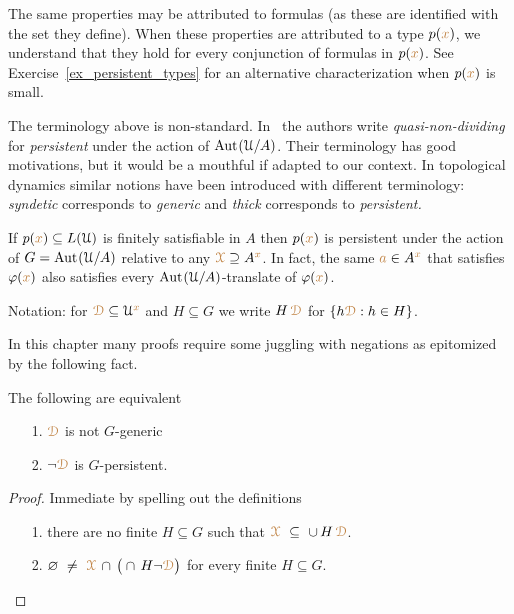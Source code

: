 The same properties may be attributed to formulas (as these are identified with the set they define).
When these properties are attributed to a type $p({\color{brown} x})$, we understand that they hold for every conjunction of formulas in $p({\color{brown} x})$.
See Exercise~\ref{ex_persistent_types} for an alternative characterization when $p({\color{brown} x})$ is small.

\noindent\llap{\textcolor{red}{\Large\warning}\kern1.5ex}\ignorespaces
The terminology above is non-standard.
In~\cite{CK} the authors write \textit{quasi-non-dividing\/} for \textit{persistent\/} under the action of ${\rm Aut\kern.15ex}(\EuScript U/A)$.
Their terminology has good motivations, but it would be a mouthful if adapted to our context.
In topological dynamics similar notions have been introduced with different terminology: \textit{syndetic\/} corresponds to \textit{generic\/} and \textit{thick\/} corresponds to \textit{persistent.}

\begin{example}
  If $p({\color{brown} x})\subseteq L(\EuScript U)$ is finitely satisfiable in $A$ then $p({\color{brown} x})$ is persistent under the action of $G={\rm Aut\kern.15ex}(\EuScript U/A)$ relative to any ${\color{brown}\EuScript X}\supseteq A^{\color{brown} x}$.
  In fact, the same ${\color{brown} a}\in A^{\color{brown} x}$ that satisfies $\varphi({\color{brown} x})$ also satisfies every ${\rm Aut\kern.15ex}(\EuScript U/A)$-translate of $\varphi({\color{brown} x})$.
\end{example}

Notation: for ${\color{brown}\EuScript D}\subseteq\EuScript U^{\color{brown} x}$ and $H\subseteq G$ we write \emph{$H\,{\color{brown}\EuScript D}$\/} for $\{h{\color{brown}\EuScript D}: h\in H\}$.

In this chapter many proofs require some juggling with negations as epitomized by the following fact.

\begin{fact}\label{fact_fip}
  The following are equivalent
  \begin{itemize}
    \item[1.] ${\color{brown}\EuScript D}$ is not $G$-generic
    \item[2.] $\neg{\color{brown}\EuScript D}$ is $G$-persistent.
  \end{itemize}
\end{fact}

\begin{proof}
  Immediate by spelling out the definitions
  \begin{itemize}
    \item[1.] there are no finite $H\subseteq G$ such that ${\color{brown}\EuScript X}\ \subseteq\ \cup\, H\,{\color{brown}\EuScript D}$.
    \item[2.]  $\varnothing\ \neq\ {\color{brown}\EuScript X}\,\cap\,\big(\cap\, H\neg{\color{brown}\EuScript D}\big)$ for every finite $H\subseteq G$.\qedhere
  \end{itemize} 
\end{proof}

